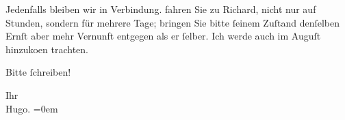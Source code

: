 \pstart
           Jedenfalls bleiben wir in Verbindung.  fahren
               Sie zu Richard, nicht nur auf Stunden, sondern
               für mehrere Tage; bringen Sie bitte ſeinem Zuſtand denſelben Ernſt aber mehr {\pb}Vernunft entgegen als er ſelber.
               Ich werde auch im Auguſt hinzuko{\geminationm}en
               trachten.\pend
           
\pstart
           Bitte ſchreiben!\pend
           
\pstart
           Ihr{\\[\baselineskip]}\spacefill\mbox{Hugo.}\pend
           \leftskip=0em{}\endnumbering{}  
      